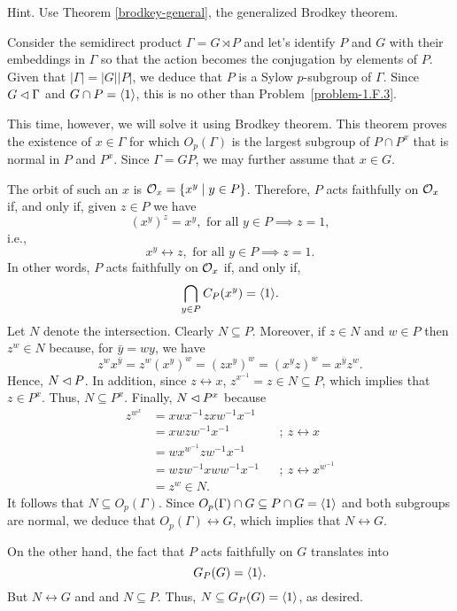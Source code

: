 \begin{solution}
\begin{probl}
    \textrm{\rm Hint. Use Theorem \ref{brodkey-general}, the generalized Brodkey theorem.}
\end{probl}

\begin{solution} Consider the semidirect product $\Gamma=G\rtimes P$ and let's identify $P$ and $G$ with their embeddings in $\Gamma$ so that the action becomes the conjugation by elements of $P$. Given that $|\Gamma|=|G||P|$, we deduce that $P$ is a Sylow $p$-subgroup of $\Gamma$. Since $G\lhd\Gamma$ and $G\cap P=\langle1\rangle$, this is no other than Problem~\ref{problem-1.F.3}.

This time, however, we will solve it using Brodkey theorem. This theorem proves the existence of $x\in\Gamma$ for which $O_p(\Gamma)$ is the largest subgroup of $P\cap P^x$ that is normal in $P$ and $P^x$. Since $\Gamma=GP$, we may further assume that $x\in G$.

The orbit of such an $x$ is ${\cal O}_x=\{x^y\mid y\in P\}$. Therefore, $P$ acts faithfully on ${\cal O}_x$ if, and only if, given $z\in P$ we have
$$
    (x^y)^z=x^y,\text{ for all }y\in P\implies z=1,
$$
i.e.,
$$
    x^y\leftrightarrow z,\text{ for all }y\in P\implies z=1.
$$
In other words, $P$ acts faithfully on ${\cal O}_x$ if, and only if,
$$
    \bigcap_{y\in P}C_P(x^y)=\langle1\rangle.
$$
Let $N$ denote the intersection. Clearly $N\subseteq P$. Moreover, if $z\in N$ and $w\in P$ then $z^w\in N$ because, for $\bar y=wy$, we have
$$
    z^wx^{\bar y} = z^w(x^y)^w = (zx^y)^w=(x^yz)^w = x^{\bar y}z^w.
$$
Hence, $N\lhd P$. In addition, since $z\leftrightarrow x$, $z^{x^{-1}}=z\in N\subseteq P$, which implies that $z\in P^x$. Thus, $N\subseteq P^x$. Finally, $N\lhd P^x$ because
\begin{align*}
    z^{w^x} &= xwx^{-1}zxw^{-1}x^{-1}\\
        &= xwzw^{-1}x^{-1}  &&;\ z\leftrightarrow x\\
        &= wx^{w^{-1}}zw^{-1}x^{-1}\\
        &= wzw^{-1}xww^{-1}x^{-1}   &&;\ z\leftrightarrow x^{w^{-1}}\\
        &= z^w \in N.
\end{align*}
It follows that $N\subseteq O_p(\Gamma)$. Since $O_p(\Gamma)\cap G\subseteq P\cap G=\langle1\rangle$ and both subgroups are normal, we deduce that $O_p(\Gamma)\leftrightarrow G$, which implies that $N\leftrightarrow G$.

On the other hand, the fact that $P$ acts faithfully on $G$ translates into
$$
    G_P(G)=\langle1\rangle.
$$
But $N\leftrightarrow G$ and and $N\subseteq P$. Thus, $N\subseteq G_P(G)=\langle1\rangle$, as desired.  \end{solution}


\end{solution}
